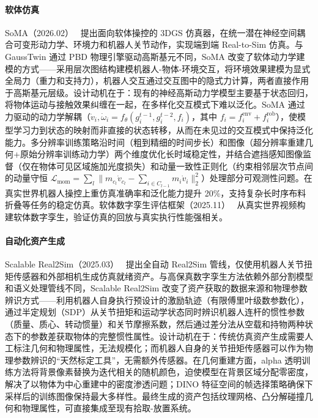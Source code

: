 \paragraph{软体仿真}

SoMA（2026.02）~\cite{2602_02402} 提出面向软体操控的 3DGS 仿真器，在统一潜在神经空间耦合可变形动力学、环境力和机器人关节动作，实现端到端 Real-to-Sim 仿真。与 GaussTwin 通过 PBD 物理引擎驱动高斯基元不同，SoMA 改变了软体动力学建模的方式——采用层次图结构建模机器人-物体-环境交互，将环境效果建模为显式全局力（重力和支持力），机器人交互通过交互图中的隐式力计算，两者直接作用于高斯基元层级。设计动机在于：现有的神经高斯动力学模型主要基于状态回归，将物体运动与接触效果纠缠在一起，在多样化交互模式下难以泛化。SoMA 通过力驱动的动力学解耦（$\dot{v}_i, \dot{\omega}_i = f_\theta(g_i^{t-1}, g_i^{t-2}, f_i)$，其中 $f_i = f_i^\text{env} + f_i^\text{rob}$），使模型学习力到状态的映射而非直接的状态转移，从而在未见过的交互模式中保持泛化能力。多分辨率训练策略沿时间（粗到精细的时间步长）和图像（超分辨率重建几何+原始分辨率训练动力学）两个维度优化长时域稳定性，并结合遮挡感知图像监督（仅在物体可见区域施加光度损失）和动量一致性正则化（约束相邻层次节点间的动量守恒 $\mathcal{L}_\text{mom} = \sum_l \|m_{c_l}\dot{v}_{c_l} - \sum_{i \in C_{l-1}} m_i \dot{v}_i\|_2^2$）处理部分可观测性问题。在真实世界机器人操控上重仿真准确率和泛化能力提升 20\%，支持复杂长时序布料折叠等任务的稳定仿真。软体数字孪生评估框架（2025.11）~\cite{2511_04665} 从真实世界视频构建软体数字孪生，验证仿真的回放与真实执行性能强相关。

\paragraph{自动化资产生成}

Scalable Real2Sim（2025.03）~\cite{2503_00370} 提出全自动 Real2Sim 管线，仅使用机器人关节扭矩传感器和外部相机生成仿真就绪资产。与高保真数字孪生方法依赖外部分割模型和语义处理管线不同，Scalable Real2Sim 改变了资产获取的数据来源和物理参数辨识方式——利用机器人自身执行预设计的激励轨迹（有限傅里叶级数参数化），通过半定规划（SDP）从关节扭矩和运动学状态同时辨识机器人连杆的惯性参数（质量、质心、转动惯量）和关节摩擦系数，然后通过差分法从空载和持物两种状态下的参数差获取物体的完整惯性属性。设计动机在于：传统仿真资产生成需要人工标注几何和物理属性，无法规模化；而机器人自身的关节扭矩传感器可以作为物理参数辨识的``天然标定工具''，无需额外传感器。在几何重建方面，alpha 透明训练方法将背景像素替换为迭代相关的随机颜色，迫使模型在背景区域分配零密度，解决了以物体为中心重建中的密度渗透问题；DINO 特征空间的帧选择策略确保下采样后的训练图像保持最大多样性。最终生成的资产包括纹理网格、凸分解碰撞几何和物理属性，可直接集成至现有拾取-放置系统。

